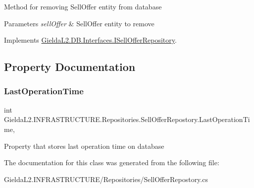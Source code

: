 Method for removing Sell\+Offer entity from database 


\begin{DoxyParams}{Parameters}
{\em sell\+Offer} & Sell\+Offer entity to remove\\
\hline
\end{DoxyParams}


Implements \mbox{\hyperlink{interface_gielda_l2_1_1_d_b_1_1_interfaces_1_1_i_sell_offer_repository_ab77d59db7295ed7a3c7457f8cc0d84d2}{Gielda\+L2.\+D\+B.\+Interfaces.\+I\+Sell\+Offer\+Repository}}.



\subsection{Property Documentation}
\mbox{\label{class_gielda_l2_1_1_i_n_f_r_a_s_t_r_u_c_t_u_r_e_1_1_repositories_1_1_sell_offer_repostory_af456365d00cc4fcbb2f280ec86dc1a1c}} 
\subsubsection{\texorpdfstring{LastOperationTime}{LastOperationTime}}
{\footnotesize\ttfamily int Gielda\+L2.\+I\+N\+F\+R\+A\+S\+T\+R\+U\+C\+T\+U\+R\+E.\+Repositories.\+Sell\+Offer\+Repostory.\+Last\+Operation\+Time\hspace{0.3cm}{\ttfamily [get]}, {\ttfamily [set]}}



Property that stores last operation time on database 



The documentation for this class was generated from the following file\+:\begin{DoxyCompactItemize}
\item 
Gielda\+L2.\+I\+N\+F\+R\+A\+S\+T\+R\+U\+C\+T\+U\+R\+E/\+Repositories/Sell\+Offer\+Repostory.\+cs\end{DoxyCompactItemize}
